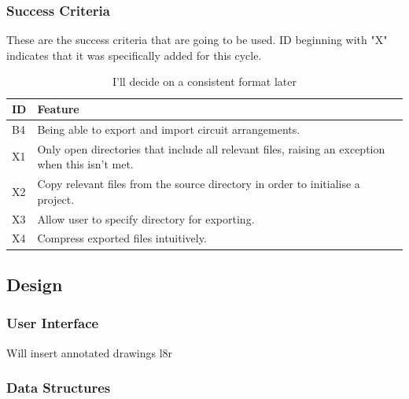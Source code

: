 \documentclass[11pt]{article}
\begin{document}
            \subsubsection{Success Criteria}
                These are the success criteria that are going to be used. ID beginning with "X" indicates that it was specifically added for this cycle.
                \begin{table}[!ht]
                    \begin{center}
                    \begin{tabular}{m{16pt}m{}}
                    ID & Feature \\ \hline
                    B4 & Being able to export and import circuit arrangements. \\ 
                    X1 & Only open directories that include all relevant files, raising an exception when this isn't met. \\ 
                    X2 & Copy relevant files from the source directory in order to initialise a project. \\ 
                    X3 & Allow user to specify directory for exporting. \\ 
                    X4 & Compress exported files intuitively. \\ 
                    \end{tabular}
                \end{center}
                \caption{I'll decide on a consistent format later}
                    
                \end{table}
        \subsection{Design}
        \subsubsection{User Interface}

                Will insert annotated drawings l8r
        \subsubsection{Data Structures}
\end{document}
